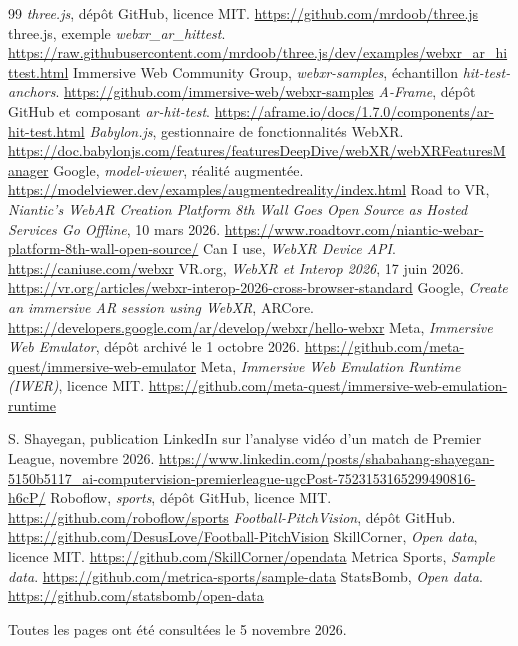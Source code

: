 \documentclass[11pt,a4paper]{article}
\begin{document}
\begin{thebibliography}{99}
 \emph{three.js}, dépôt GitHub, licence MIT. \url{https://github.com/mrdoob/three.js}
 three.js, exemple \emph{webxr\_ar\_hittest}. \url{https://raw.githubusercontent.com/mrdoob/three.js/dev/examples/webxr_ar_hittest.html}
 Immersive Web Community Group, \emph{webxr-samples}, échantillon \emph{hit-test-anchors}. \url{https://github.com/immersive-web/webxr-samples}
 \emph{A-Frame}, dépôt GitHub et composant \emph{ar-hit-test}. \url{https://aframe.io/docs/1.7.0/components/ar-hit-test.html}
 \emph{Babylon.js}, gestionnaire de fonctionnalités WebXR. \url{https://doc.babylonjs.com/features/featuresDeepDive/webXR/webXRFeaturesManager}
 Google, \emph{model-viewer}, réalité augmentée. \url{https://modelviewer.dev/examples/augmentedreality/index.html}
 Road to VR, \emph{Niantic's WebAR Creation Platform 8th Wall Goes Open Source as Hosted Services Go Offline}, 10 mars 2026. \url{https://www.roadtovr.com/niantic-webar-platform-8th-wall-open-source/}
 Can I use, \emph{WebXR Device API}. \url{https://caniuse.com/webxr}
 VR.org, \emph{WebXR et Interop 2026}, 17 juin 2026. \url{https://vr.org/articles/webxr-interop-2026-cross-browser-standard}
 Google, \emph{Create an immersive AR session using WebXR}, ARCore. \url{https://developers.google.com/ar/develop/webxr/hello-webxr}
 Meta, \emph{Immersive Web Emulator}, dépôt archivé le 1\ier{} octobre 2026. \url{https://github.com/meta-quest/immersive-web-emulator}
 Meta, \emph{Immersive Web Emulation Runtime (IWER)}, licence MIT. \url{https://github.com/meta-quest/immersive-web-emulation-runtime}

 S. Shayegan, publication LinkedIn sur l'analyse vidéo d'un match de Premier League, novembre 2026. \url{https://www.linkedin.com/posts/shabahang-shayegan-5150b5117_ai-computervision-premierleague-ugcPost-7523153165299490816-h6cP/}
 Roboflow, \emph{sports}, dépôt GitHub, licence MIT. \url{https://github.com/roboflow/sports}
 \emph{Football-PitchVision}, dépôt GitHub. \url{https://github.com/DesusLove/Football-PitchVision}
 SkillCorner, \emph{Open data}, licence MIT. \url{https://github.com/SkillCorner/opendata}
 Metrica Sports, \emph{Sample data}. \url{https://github.com/metrica-sports/sample-data}
 StatsBomb, \emph{Open data}. \url{https://github.com/statsbomb/open-data}
\end{thebibliography}

\vspace{4pt}
{\footnotesize\color{gris} Toutes les pages ont été consultées le 5 novembre 2026.}
\end{document}
